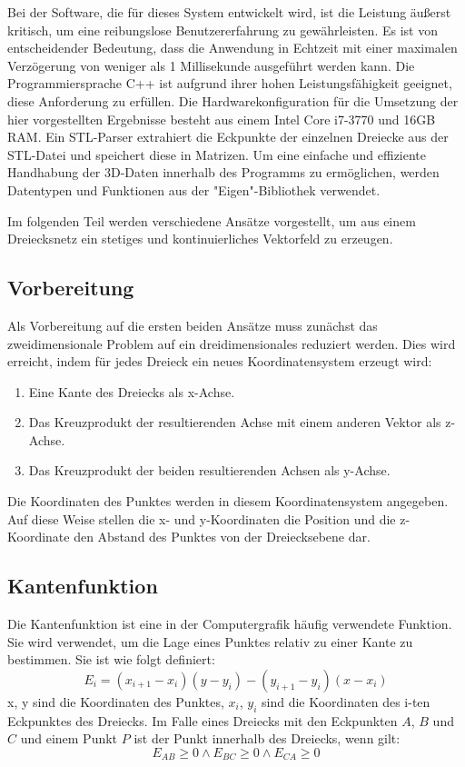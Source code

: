 \documentclass[conference]{IEEEtran}
\begin{document}
Bei der Software, die für dieses System entwickelt wird, ist die Leistung äußerst kritisch, um eine reibungslose Benutzererfahrung zu gewährleisten. Es ist von entscheidender Bedeutung, dass die Anwendung in Echtzeit mit einer maximalen Verzögerung von weniger als 1 Millisekunde ausgeführt werden kann. Die Programmiersprache C++ ist aufgrund ihrer hohen Leistungsfähigkeit geeignet, diese Anforderung zu erfüllen. Die Hardwarekonfiguration für die Umsetzung der hier vorgestellten Ergebnisse besteht aus einem Intel Core i7-3770 und 16GB RAM. Ein STL-Parser extrahiert die Eckpunkte der einzelnen Dreiecke aus der STL-Datei und speichert diese in Matrizen. Um eine einfache und effiziente Handhabung der 3D-Daten innerhalb des Programms zu ermöglichen, werden Datentypen und Funktionen aus der "Eigen"-Bibliothek verwendet. 

Im folgenden Teil werden verschiedene Ansätze vorgestellt, um aus einem Dreiecksnetz ein stetiges und kontinuierliches Vektorfeld zu erzeugen. 

\subsection*{Vorbereitung}
Als Vorbereitung auf die ersten beiden Ansätze muss zunächst das zweidimensionale Problem auf ein dreidimensionales reduziert werden. Dies wird erreicht, indem für jedes Dreieck ein neues Koordinatensystem erzeugt wird:
\begin{enumerate}
    \item Eine Kante des Dreiecks als x-Achse.
    \item Das Kreuzprodukt der resultierenden Achse mit einem anderen Vektor als z-Achse.
    \item Das Kreuzprodukt der beiden resultierenden Achsen als y-Achse.
\end{enumerate}
Die Koordinaten des Punktes werden in diesem Koordinatensystem angegeben. Auf diese Weise stellen die x- und y-Koordinaten die Position und die z-Koordinate den Abstand des Punktes von der Dreiecksebene dar.

\subsection{Kantenfunktion}\label{edge}
Die Kantenfunktion ist eine in der Computergrafik häufig verwendete Funktion. Sie wird verwendet, um die Lage eines Punktes relativ zu einer Kante \autocite{pinedaParallelAlgorithmPolygon1988} zu bestimmen. Sie ist wie folgt definiert:
\begin{equation}
    E_{i} = (x_{i+1} - x_{i})(y - y_{i}) - (y_{i+1} - y_{i})(x - x_{i})
\end{equation}
x, y sind die Koordinaten des Punktes, $x_{i}$, $y_{i}$ sind die Koordinaten des i-ten Eckpunktes des Dreiecks. Im Falle eines Dreiecks mit den Eckpunkten $A$, $B$ und $C$ und einem Punkt $P$ ist der Punkt innerhalb des Dreiecks, wenn gilt:
\begin{equation}
    E_{AB} \geq 0 \land E_{BC} \geq 0 \land E_{CA} \geq 0
\end{equation}
\end{document}
